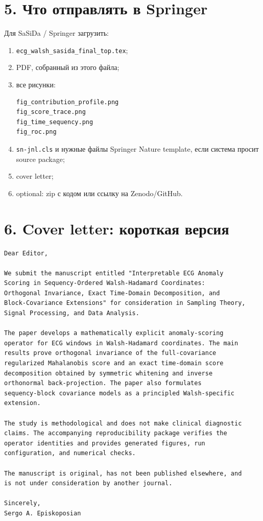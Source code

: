 \documentclass[12pt,a4paper]{article}
\begin{document}
\section*{5. Что отправлять в Springer}

Для SaSiDa / Springer загрузить:

\begin{enumerate}[label=\arabic*)]
\item \texttt{ecg\_walsh\_sasida\_final\_top.tex};
\item PDF, собранный из этого файла;
\item все рисунки:
\begin{verbatim}
fig_contribution_profile.png
fig_score_trace.png
fig_time_sequency.png
fig_roc.png
\end{verbatim}
\item \texttt{sn-jnl.cls} и нужные файлы Springer Nature template, если система просит source package;
\item cover letter;
\item optional: zip с кодом или ссылку на Zenodo/GitHub.
\end{enumerate}

\section*{6. Cover letter: короткая версия}

\begin{verbatim}
Dear Editor,

We submit the manuscript entitled "Interpretable ECG Anomaly
Scoring in Sequency-Ordered Walsh-Hadamard Coordinates:
Orthogonal Invariance, Exact Time-Domain Decomposition, and
Block-Covariance Extensions" for consideration in Sampling Theory,
Signal Processing, and Data Analysis.

The paper develops a mathematically explicit anomaly-scoring
operator for ECG windows in Walsh-Hadamard coordinates. The main
results prove orthogonal invariance of the full-covariance
regularized Mahalanobis score and an exact time-domain score
decomposition obtained by symmetric whitening and inverse
orthonormal back-projection. The paper also formulates
sequency-block covariance models as a principled Walsh-specific
extension.

The study is methodological and does not make clinical diagnostic
claims. The accompanying reproducibility package verifies the
operator identities and provides generated figures, run
configuration, and numerical checks.

The manuscript is original, has not been published elsewhere, and
is not under consideration by another journal.

Sincerely,
Sergo A. Episkoposian
\end{verbatim}
\end{document}
